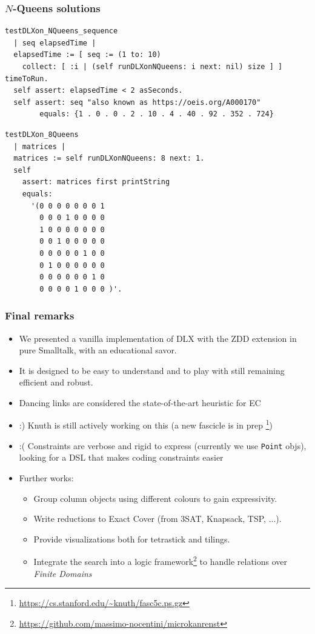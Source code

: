 \documentclass[10pt]{beamer}
\begin{document}
\begin{frame}[fragile]
\frametitle{$N$-Queens solutions}
\begin{verbatim}
testDLXon_NQueens_sequence
  | seq elapsedTime |
  elapsedTime := [ seq := (1 to: 10)
    collect: [ :i | (self runDLXonNQueens: i next: nil) size ] ] timeToRun.
  self assert: elapsedTime < 2 asSeconds.
  self assert: seq "also known as https://oeis.org/A000170"
        equals: {1 . 0 . 0 . 2 . 10 . 4 . 40 . 92 . 352 . 724}
\end{verbatim}
\begin{verbatim}
testDLXon_8Queens
  | matrices |
  matrices := self runDLXonNQueens: 8 next: 1.
  self
    assert: matrices first printString
    equals:
      '(0 0 0 0 0 0 0 1
        0 0 0 1 0 0 0 0
        1 0 0 0 0 0 0 0
        0 0 1 0 0 0 0 0
        0 0 0 0 0 1 0 0
        0 1 0 0 0 0 0 0
        0 0 0 0 0 0 1 0
        0 0 0 0 1 0 0 0 )'.
\end{verbatim}

\end{frame}

\begin{frame}[fragile]
\frametitle{Final remarks}
\begin{itemize}
  \item We presented a vanilla implementation of DLX with the ZDD extension
          in pure Smalltalk, with an educational savor.
  \item It is designed to be easy to understand and to play with
          still remaining efficient and robust.
  \item Dancing links are considered the state-of-the-art heuristic for EC
  \item :) Knuth is still actively working on this (a new fascicle is in prep \footnote{\url{https://cs.stanford.edu/~knuth/fasc5c.ps.gz}})
  \item :( Constraints are verbose and rigid to express (currently we use \texttt{Point} objs), 
        looking for a DSL that makes coding constraints easier
  \item Further works:
    \begin{itemize}
      \item Group column objects using different colours to gain expressivity.
      \item Write reductions to Exact Cover (from $3$SAT, Knapsack, TSP, ...).
	  \item Provide visualizations both for tetrastick and tilings.
	  \item Integrate the search into a logic framework\footnote{\url{https://github.com/massimo-nocentini/microkanrenst}} to handle
	  relations over \emph{Finite Domains}
    \end{itemize}
\end{itemize}
\end{frame}
\end{document}
